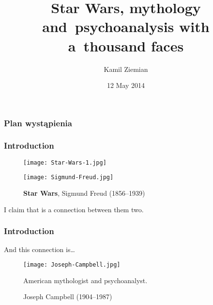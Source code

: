 \documentclass[10pt,t]{beamer}
\title{Star Wars, mythology \\
  and~psychoanalysis with a~thousand faces}
\author{Kamil Ziemian}
\date{12 May 2014}
\begin{document}






\RaggedRight





\maketitle %





\begin{frame}
  \frametitle{Plan wystąpienia}


  \tableofcontents

\end{frame}





\begin{frame}
  \frametitle{Introduction}


  \begin{figure}

    \centering

    \texttt{[image: Star-Wars-1.jpg]}

    \texttt{[image: Sigmund-Freud.jpg]}

    \caption{\textbf{Star Wars}, Sigmund Freud (1856--1939)}

  \end{figure}

  I claim that is a connection between them two.

\end{frame}



\begin{frame}
  \frametitle{Introduction}

  \begin{block}{And this connection is\ldots}
    \begin{figure}
      \centering

      \texttt{[image: Joseph-Campbell.jpg]}
      \caption{Joseph Campbell (1904--1987)}
      American mythologist and psychoanalyst.
    \end{figure}
  \end{block}

\end{frame}
\end{document}
